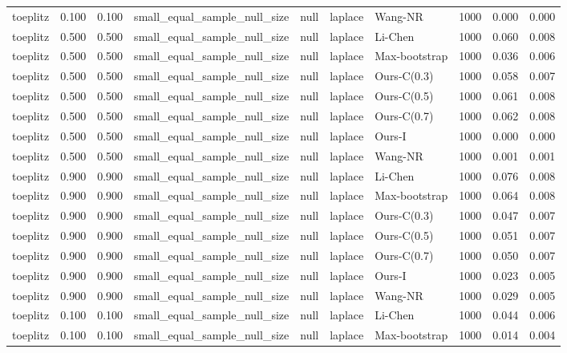 \begin{tabular}{lrrllllrrr}
toeplitz & 0.100 & 0.100 & small\_equal\_sample\_null\_size & null & laplace & Wang-NR & 1000 & 0.000 & 0.000 \\
toeplitz & 0.500 & 0.500 & small\_equal\_sample\_null\_size & null & laplace & Li-Chen & 1000 & 0.060 & 0.008 \\
toeplitz & 0.500 & 0.500 & small\_equal\_sample\_null\_size & null & laplace & Max-bootstrap & 1000 & 0.036 & 0.006 \\
toeplitz & 0.500 & 0.500 & small\_equal\_sample\_null\_size & null & laplace & Ours-C(0.3) & 1000 & 0.058 & 0.007 \\
toeplitz & 0.500 & 0.500 & small\_equal\_sample\_null\_size & null & laplace & Ours-C(0.5) & 1000 & 0.061 & 0.008 \\
toeplitz & 0.500 & 0.500 & small\_equal\_sample\_null\_size & null & laplace & Ours-C(0.7) & 1000 & 0.062 & 0.008 \\
toeplitz & 0.500 & 0.500 & small\_equal\_sample\_null\_size & null & laplace & Ours-I & 1000 & 0.000 & 0.000 \\
toeplitz & 0.500 & 0.500 & small\_equal\_sample\_null\_size & null & laplace & Wang-NR & 1000 & 0.001 & 0.001 \\
toeplitz & 0.900 & 0.900 & small\_equal\_sample\_null\_size & null & laplace & Li-Chen & 1000 & 0.076 & 0.008 \\
toeplitz & 0.900 & 0.900 & small\_equal\_sample\_null\_size & null & laplace & Max-bootstrap & 1000 & 0.064 & 0.008 \\
toeplitz & 0.900 & 0.900 & small\_equal\_sample\_null\_size & null & laplace & Ours-C(0.3) & 1000 & 0.047 & 0.007 \\
toeplitz & 0.900 & 0.900 & small\_equal\_sample\_null\_size & null & laplace & Ours-C(0.5) & 1000 & 0.051 & 0.007 \\
toeplitz & 0.900 & 0.900 & small\_equal\_sample\_null\_size & null & laplace & Ours-C(0.7) & 1000 & 0.050 & 0.007 \\
toeplitz & 0.900 & 0.900 & small\_equal\_sample\_null\_size & null & laplace & Ours-I & 1000 & 0.023 & 0.005 \\
toeplitz & 0.900 & 0.900 & small\_equal\_sample\_null\_size & null & laplace & Wang-NR & 1000 & 0.029 & 0.005 \\
toeplitz & 0.100 & 0.100 & small\_equal\_sample\_null\_size & null & laplace & Li-Chen & 1000 & 0.044 & 0.006 \\
toeplitz & 0.100 & 0.100 & small\_equal\_sample\_null\_size & null & laplace & Max-bootstrap & 1000 & 0.014 & 0.004 \\

\end{tabular}
